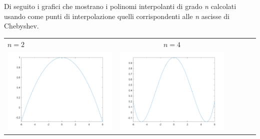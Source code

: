 \begin{center}
\footnotesize\noindent{}\end{center}

\noindent Di seguito i grafici che mostrano i polinomi interpolanti di grado \textit{n} calcolati usando come punti di interpolazione quelli corrispondenti alle \textit{n} ascisse di Chebyshev. \\

\noindent\small\begin{tabular}{l*{5}{c}}
\hspace{3.5cm}\(n=2\) & \(n=4\) \\
\includegraphics[scale=0.5]{cap4/4_7/2.png} &  \includegraphics[scale=0.5]{cap4/4_7/4.png} \\


\end{tabular}
